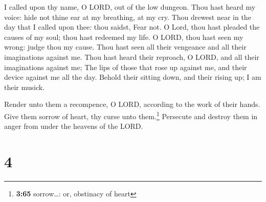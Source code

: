  I called upon thy name, O LORD, out of the low dungeon.
 Thou hast heard my voice: hide not thine ear at my
breathing, at my cry.  Thou drewest near in the day that
I called upon thee: thou saidst, Fear not.  O Lord, thou
hast pleaded the causes of my soul; thou hast redeemed my life.
 O LORD, thou hast seen my wrong: judge thou my cause.
 Thou hast seen all their vengeance and all their
imaginations against me.  Thou hast heard their reproach,
O LORD, and all their imaginations against me;  The lips
of those that rose up against me, and their device against me all the
day.  Behold their sitting down, and their rising up; I
am their musick.

 Render unto them a recompence, O LORD, according to the
work of their hands.  Give them sorrow of heart, thy
curse unto them.\footnote{\textbf{3:65} sorrow\ldots: or, obstinacy of
  heart}  Persecute and destroy them in anger from under
the heavens of the LORD.

\hypertarget{section-3}{%
\section{4}\label{section-3}}

